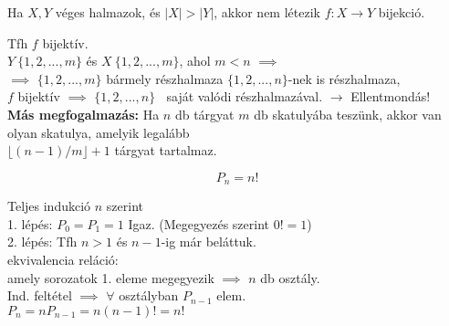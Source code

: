 \begin{frame}

\begin{tcolorbox}[title={Tétel: Skatulya-elv}]
Ha $X, Y$ véges halmazok, és $|X| > |Y|$, akkor nem létezik $f: X \rightarrow Y$ bijekció.

\end{tcolorbox}

\begin{tcolorbox}[title={Bizonyítás (Indirekt)}]
Tfh $f$ bijektív.\\
$Y ~ \{1, 2, ..., m\}$ és $X ~ \{1, 2, ..., m\}$, ahol $m < n$ $\implies$\\
$\implies$ $\{1, 2, ..., m\}$ bármely részhalmaza $\{1, 2, ..., n\}$-nek is részhalmaza,\\
$f$ bijektív $\implies$ $\{1, 2, ..., n\}$ $~$ saját valódi részhalmazával. $\rightarrow$ Ellentmondás!\\
\bigskip
\textbf{Más megfogalmazás:} Ha $n$ db tárgyat $m$ db skatulyába teszünk, akkor van olyan skatulya, amelyik legalább\\
$\lfloor (n - 1) / m \rfloor + 1$ tárgyat tartalmaz.

\end{tcolorbox}

\end{frame}

\begin{frame}

\begin{tcolorbox}[title={Tétel: Permutációk száma}]
$$P_n = n!$$

\end{tcolorbox}

\begin{tcolorbox}[title={Bizonyítás}]
Teljes indukció $n$ szerint\\
1. lépés: $P_0 = P_1 = 1$ Igaz. (Megegyezés szerint $0! = 1$)\\
2. lépés: Tfh $n > 1$ és $n - 1$-ig már beláttuk.\\
ekvivalencia reláció:\\
amely sorozatok 1. eleme megegyezik $\implies$ $n$ db osztály.\\
Ind. feltétel $\implies$ $\forall$ osztályban $P_{n - 1}$ elem.\\
$P_n = nP_{n - 1} = n(n - 1)! = n!$

\end{tcolorbox}

\end{frame}

